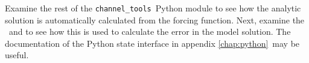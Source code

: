 Examine the rest of the \lstinline[language=python]{channel_tools}\ Python
module to see how the analytic solution is automatically calculated from the
forcing function. Next, examine the \
and  to see how this is used to
calculate the error in the model solution. The documentation of the Python
state interface in appendix \ref{chap:python}\ may be useful.

% 
% 
% 
% 
